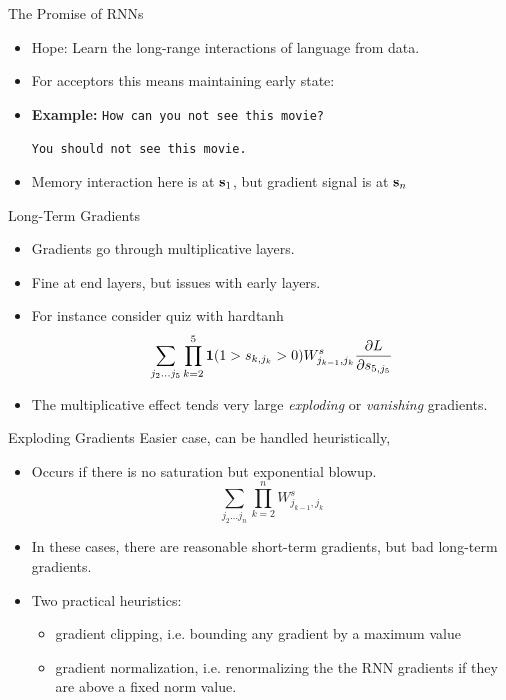 \documentclass{beamer}
\begin{document}
\begin{frame}{The Promise of RNNs}
  \begin{itemize}
  \item Hope: Learn the long-range interactions of language from data.
    \air 

  \item For acceptors this means maintaining early state:

  \item \textbf{Example:}
    \air 
    \texttt{How can you not see this movie?}
    \air 
    
    \texttt{You should not see this movie.}
    \air 
    
  \item Memory interaction here is at  $\mathbf{s}_1$, but gradient signal is at $\mathbf{s}_n$   
  \end{itemize}
\end{frame}

\begin{frame}{Long-Term Gradients}
  \begin{itemize}
  \item Gradients go through multiplicative layers.
    \air

  \item Fine at end layers, but issues with early layers.

  \item For instance consider quiz with  hardtanh
    \[      \sum_{j_2 \ldots j_5} \prod_{k=2}^5 \mathbf{1}(1 > s_{k, j_k} > 0)  W^s_{j_{k-1},j_k}  \frac{\partial L}{\partial s_{5, j_5}}    \]

    \air
  \item The multiplicative effect tends very large \textit{exploding} or \textit{vanishing} gradients.
   \air
  \end{itemize}
\end{frame}

\begin{frame}{Exploding Gradients}
  Easier case, can be handled heuristically,
  \begin{itemize}
  \item Occurs if there is no saturation but exponential blowup. 
    \[\sum_{j_2 \ldots j_n} \prod_{k=2}^n W^s_{j_{k-1},j_k} \] 

  \item In these cases, there are reasonable short-term gradients, but bad long-term gradients.

    \air
  \item Two practical heuristics:
    \begin{itemize}
    \item gradient clipping, i.e. bounding any gradient
      by a maximum value 
    \item gradient normalization, i.e. renormalizing the 
      the RNN gradients if they are above a fixed norm 
      value.
    \end{itemize}
  \end{itemize}
\end{frame}
\end{document}
